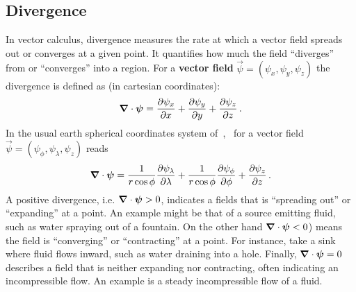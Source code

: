 \subsection{Divergence}\label{subsec:divergence}
In vector calculus, divergence measures the rate at which a vector field spreads out or converges at a given point.
It quantifies how much the field ``diverges'' from or ``converges'' into a region.
For a \textbf{vector field} $\vec{\psi}=(\psi_x,\psi_y,\psi_z)$ the divergence is defined as (in cartesian coordinates):
\begin{equation}
	\diverg{\vec{\psi}}= \partialx{\psi_x} + \partialy{\psi_y} + \partialz{\psi_z} \, .
	\label{eq:divergence-def}
\end{equation}
In the usual earth spherical coordinates system
of~\secref{\ref{subsec:spherical-coordinate-systems}},~\eq{\ref{eq:divergence-def}} for a vector field
$\vec{\psi} = (\psi_{\phi}, \psi_{\lambda}, \psi_{z})$ reads
\begin{equation}
	\diverg{\vec{\psi}} = \frac{1}{r \cos \phi} \partiallambda{\psi_{\lambda}} +
	\frac{1}{r \cos \phi} \partialphi{\psi_{\phi}} +
	\partialz{\psi_z} \, .
	\label{eq:divergence-spherical-coords}
\end{equation}
A positive divergence, i.e. $\diverg{\vec{\psi}}>0$, indicates a fields that is ``spreading out'' or ``expanding'' at a point.
An example might be that of a source emitting fluid, such as water spraying out of a fountain.
On the other hand $\diverg{\vec{\psi}}<0$) means the field is ``converging'' or ``contracting'' at a point.
For instance, take a sink where fluid flows inward, such as water draining into a hole.
Finally, $\diverg{\vec{\psi}}=0$ describes a field that is neither expanding nor contracting,
often indicating an incompressible flow.
An example is a steady incompressible flow of a fluid.



